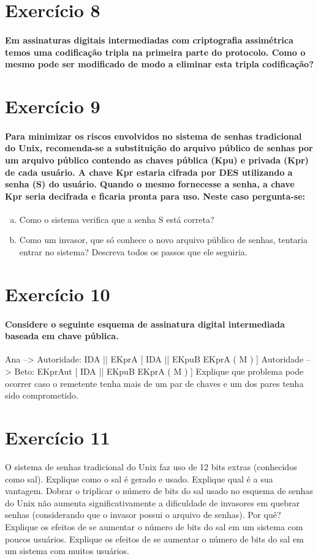 \documentclass[10pt,a4paper]{report}
\begin{document}
\section*{Exercício 8}
\paragraph{ Em assinaturas digitais intermediadas com criptografia assimétrica temos uma codificação tripla na primeira parte do protocolo. Como o mesmo pode ser modificado de modo a eliminar esta tripla codificação?}

\section*{Exercício 9}
\paragraph{ Para minimizar os riscos envolvidos no sistema de senhas tradicional do Unix, recomenda-se a substituição do arquivo público de senhas por um arquivo público contendo as chaves pública (Kpu) e privada (Kpr) de cada usuário. A chave Kpr estaria cifrada por DES utilizando a senha (S) do usuário. Quando o mesmo fornecesse a senha, a chave Kpr seria decifrada e ficaria pronta para uso. Neste caso pergunta-se:}
\begin{enumerate}[(a)]
\item Como o sistema verifica que a senha S está correta?
\item Como um invasor, que só conhece o novo arquivo público de senhas, tentaria entrar no sistema? Descreva todos os passos que ele seguiria.
\end{enumerate}
\section*{Exercício 10}
\paragraph{ Considere o seguinte esquema de assinatura digital intermediada baseada em chave pública.}
Ana --> Autoridade: IDA || EKprA [ IDA || EKpuB { EKprA ( M ) } ]
Autoridade --> Beto: EKprAut [ IDA || EKpuB { EKprA ( M ) } ]
Explique que problema pode ocorrer caso o remetente tenha mais de um par de chaves e um dos pares tenha sido comprometido.

\section*{Exercício 11}
O sistema de senhas tradicional do Unix faz uso de 12 bits extras (conhecidos como sal).
Explique como o sal é gerado e usado.
Explique qual é a sua vantagem.
Dobrar o triplicar o número de bits do sal usado no esquema de senhas do Unix não aumenta significativamente a dificuldade de invasores em quebrar senhas (considerando que o invasor possui o arquivo de senhas). Por quê?
Explique os efeitos de se aumentar o número de bits do sal em um sistema com poucos usuários.
Explique os efeitos de se aumentar o número de bits do sal em um sistema com muitos usuários.
\end{document}
